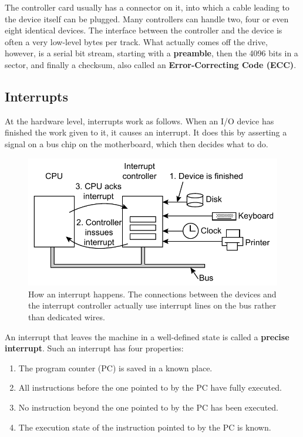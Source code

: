 \documentclass[11pt,a4paper]{article}
\begin{document}
The controller card usually has a connector on it, into which a cable leading to the device itself can be plugged. Many controllers can handle two, four or even eight identical devices. The interface between the controller and the device is often a very low-level bytes per track. What actually comes off the drive, however, is a serial bit stream, starting with a \textbf{preamble}, then the 4096 bits in a sector, and finally a checksum, also called an \textbf{Error-Correcting Code (ECC)}.

\subsection{Interrupts}
At the hardware level, interrupts work as follows. When an I/O device has finished the work given to it, it causes an interrupt. It does this by asserting a signal on a bus chip on the motherboard, which then decides what to do.

\begin{figure}[h!]
	\centering
		\includegraphics[width=\linewidth]{img/int.pdf}
	\caption{How an interrupt happens. The connections between the devices and the interrupt controller actually use interrupt lines on the bus rather than dedicated wires.}
\end{figure}

An interrupt that leaves the machine in a well-defined state is called a \textbf{precise interrupt}. Such an interrupt has four properties:
\begin{enumerate}
\item{The program counter (PC) is saved in a known place.}
\item{All instructions before the one pointed to by the PC have fully executed.}
\item{No instruction beyond the one pointed to by the PC has been executed.}
\item{The execution state of the instruction pointed to by the PC is known.}
\end{enumerate}
\end{document}
